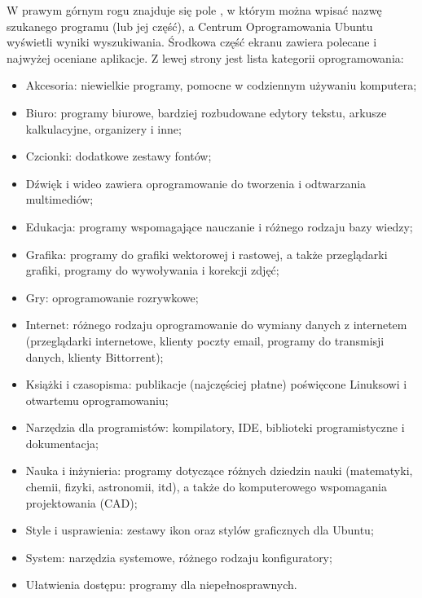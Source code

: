 W prawym górnym rogu znajduje się pole , w którym można wpisać nazwę szukanego programu (lub jej część), a Centrum Oprogramowania Ubuntu wyświetli wyniki wyszukiwania. Środkowa część ekranu zawiera polecane i najwyżej oceniane aplikacje. Z lewej strony  jest lista kategorii oprogramowania:
\begin{itemize}
\item \textcolor{ubuntu_orange}{Akcesoria}: niewielkie programy, pomocne w codziennym używaniu komputera;
\item \textcolor{ubuntu_orange}{Biuro}: programy biurowe, bardziej rozbudowane edytory tekstu, arkusze kalkulacyjne, organizery i inne;
\item \textcolor{ubuntu_orange}{Czcionki}: dodatkowe zestawy fontów;
\item \textcolor{ubuntu_orange}{Dźwięk i wideo} zawiera oprogramowanie do tworzenia i odtwarzania multimediów;
\item \textcolor{ubuntu_orange}{Edukacja}: programy wspomagające nauczanie i różnego rodzaju bazy wiedzy;
\item \textcolor{ubuntu_orange}{Grafika}: programy do grafiki wektorowej i rastowej, a także przeglądarki grafiki, programy do wywoływania i korekcji zdjęć;
\item \textcolor{ubuntu_orange}{Gry}: oprogramowanie rozrywkowe;
\item \textcolor{ubuntu_orange}{Internet}: różnego rodzaju oprogramowanie do wymiany danych z internetem (przeglądarki internetowe, klienty poczty email, programy do transmisji danych, klienty Bittorrent);
\item \textcolor{ubuntu_orange}{Książki i czasopisma}: publikacje (najczęściej płatne) poświęcone Linuksowi i otwartemu oprogramowaniu;
\item \textcolor{ubuntu_orange}{Narzędzia dla programistów}: kompilatory, IDE, biblioteki programistyczne i dokumentacja;
\item \textcolor{ubuntu_orange}{Nauka i inżynieria}: programy dotyczące różnych dziedzin nauki (matematyki, chemii, fizyki, astronomii, itd), a także do komputerowego wspomagania projektowania (CAD);
\item \textcolor{ubuntu_orange}{Style i usprawienia}: zestawy ikon oraz stylów graficznych dla Ubuntu;
\item \textcolor{ubuntu_orange}{System}: narzędzia systemowe, różnego rodzaju konfiguratory;
\item \textcolor{ubuntu_orange}{Ułatwienia dostępu}: programy dla niepełnosprawnych.
\end{itemize}

